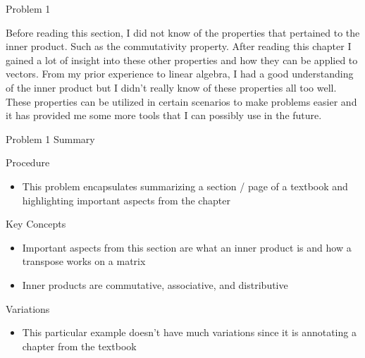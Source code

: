 \begin{problem}{Problem 1}
    \begin{highlight}
        Before reading this section, I did not know of the properties that pertained to the inner product. Such as the commutativity property. After reading this chapter I gained a lot of insight
        into these other properties and how they can be applied to vectors. From my prior experience to linear algebra, I had a good understanding of the inner product but I didn't really know of
        these properties all too well. These properties can be utilized in certain scenarios to make problems easier and it has provided me some more tools that I can possibly use in the future.
    \end{highlight}
\end{problem}

\begin{summary}{Problem 1 Summary}
    \begin{statement}{Procedure}
        \begin{itemize}
            \item This problem encapsulates summarizing a section / page of a textbook and highlighting important aspects from the chapter
        \end{itemize}
    \end{statement}
    \begin{statement}{Key Concepts}
        \begin{itemize}
            \item Important aspects from this section are what an inner product is and how a transpose works on a matrix
            \item Inner products are commutative, associative, and distributive
        \end{itemize}
    \end{statement}
    \begin{statement}{Variations}
        \begin{itemize}
            \item This particular example doesn't have much variations since it is annotating a chapter from the textbook
        \end{itemize}
    \end{statement}
\end{summary}

